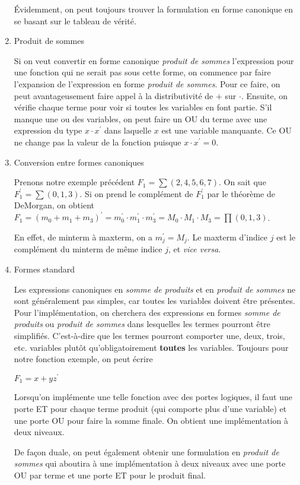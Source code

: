 \documentclass[letter, oneside]{book}
\begin{document}
\begin{enumerate}
Évidemment, on peut toujours trouver la formulation en forme canonique
en se basant sur le tableau de vérité.

\item Produit de sommes
\label{sec:org104f013}

Si on veut convertir en forme canonique \emph{produit de sommes}
l'expression pour une fonction qui ne serait pas sous cette forme, on
commence par faire l'expansion de l'expression en forme \emph{produit de
sommes}. Pour ce faire, on peut avantageusement faire appel à la
distributivité de \(+\) sur \(\cdot\). Ensuite, on vérifie chaque
terme pour voir si toutes les variables en font partie. S'il manque
une ou des variables, on peut faire un OU du terme avec une expression
du type \(x \cdot x^\prime\) dans laquelle \(x\) est une variable
manquante. Ce OU ne change pas la valeur de la fonction puisque \(x
\cdot x^\prime = 0\).

\item Conversion entre formes canoniques
\label{sec:org0ebac75}

Prenons notre exemple précédent \(F_1 = \sum (2, 4, 5, 6, 7)\). On
sait que \(F_1^\prime = \sum (0,1,3)\). Si on prend le complément de
\(F_1^\prime\) par le théorème de DeMorgan, on obtient \(F_1 = (m_0 +
m_1 + m_3)^\prime = m_0^\prime \cdot m_1^\prime \cdot m_3^\prime = M_0
\cdot M_1 \cdot M_3 = \prod (0,1,3)\).

En effet, de minterm à maxterm, on a \(m_j^\prime = M_j\). Le maxterm
d'indice \(j\) est le complément du minterm de même indice \(j\), et
\emph{vice versa}.

\item Formes standard
\label{sec:org8fcfad1}

Les expressions canoniques en \emph{somme de produits} et en \emph{produit de
sommes} ne sont généralement pas simples, car toutes les variables
doivent être présentes. Pour l'implémentation, on cherchera des
expressions en formes \emph{somme de produits} ou \emph{produit de sommes} dans
lesquelles les termes pourront être simplifiés. C'est-à-dire que les
termes pourront comporter une, deux, trois, etc. variables plutôt
qu'obligatoirement \textbf{toutes} les variables. Toujours pour notre
fonction exemple, on peut écrire

\(F_1 = x + y z^\prime\)

Lorsqu'on implémente une telle fonction avec des portes logiques, il
faut une porte ET pour chaque terme produit (qui comporte plus d'une
variable) et une porte OU pour faire la somme finale. On obtient une
implémentation à deux niveaux.

De façon duale, on peut également obtenir une formulation en \emph{produit
de sommes} qui aboutira à une implémentation à deux niveaux avec une
porte OU par terme et une porte ET pour le produit final.
\end{enumerate}
\end{document}
